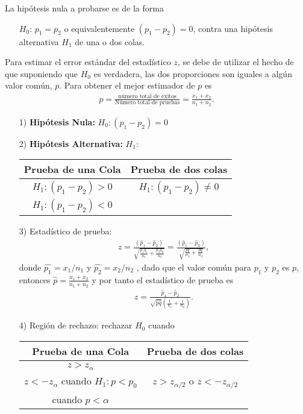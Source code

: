 \documentclass[a4paper]{report} %
\begin{document}
La hip\'otesis nula a probarse es de la forma
\begin{itemize}
\item[$H_{0}$: ] $p_{1}=p_{2}$ o equivalentemente $\left(p_{1}-p_{2}\right)=0$, contra una hip\'otesis alternativa $H_{1}$ de una o dos colas.
\end{itemize}

Para estimar el error est\'andar del estad\'istico $z$, se debe de utilizar el hecho de que suponiendo que $H_{0}$ es verdadera, las dos proporciones son iguales a alg\'un valor com\'un, $p$. Para obtener el mejor estimador de $p$ es
\begin{eqnarray}p=\frac{\textrm{n\'umero total de \'exitos}}{\textrm{N\'umero total de pruebas}}=\frac{x_{1}+x_{2}}{n_{1}+n_{2}}.\end{eqnarray}

\begin{itemize}
\item[1) ] \textbf{Hip\'otesis Nula:} $H_{0}:\left(p_{1}-p_{2}\right)=0$
\item[2) ] \textbf{Hip\'otesis Alternativa: } $H_{1}:$
\begin{center}
\begin{tabular}{cc}\hline
\textbf{Prueba de una Cola} & \textbf{Prueba de dos colas}\\\hline
$H_{1}:\left(p_{1}-p_{2}\right)>0$ & $H_{1}:\left(p_{1}-p_{2}\right)\neq 0$\\ 
$H_{1}:\left(p_{1}-p_{2}\right)<0$&\\
\end{tabular}
\end{center}
\item[3) ] Estad\'istico de prueba:
\begin{eqnarray}
z=\frac{\left(\hat{p}_{1}-\hat{p}_{2}\right)}{\sqrt{\frac{p_{1}q_{1}}{n_{1}}+\frac{p_{2}q_{2}}{n_{2}}}}=\frac{\left(\hat{p}_{1}-\hat{p}_{2}\right)}{\sqrt{\frac{pq}{n_{1}}+\frac{pq}{n_{2}}}},
\end{eqnarray}
donde $\hat{p_{1}}=x_{1}/n_{1}$ y $\hat{p_{2}}=x_{2}/n_{2}$ , dado que el valor com\'un para $p_{1}$ y $p_{2}$ es $p$, entonces $\hat{p}=\frac{x_{1}+x_{2}}{n_{1}+n_{2}}$ y por tanto el estad\'istico de prueba es
\begin{eqnarray}
z=\frac{\hat{p}_{1}-\hat{p}_{2}}{\sqrt{\hat{p}\hat{q}}\left(\frac{1}{n_{1}}+\frac{1}{n_{2}}\right)}.
\end{eqnarray}
\item[4) ] Regi\'on de rechazo: rechazar $H_{0}$ cuando
\begin{center}
\begin{tabular}{cc}\hline
\textbf{Prueba de una Cola} & \textbf{Prueba de dos colas}\\\hline
$z>z_{\alpha}$ & \\
$z<-z_{\alpha}$ cuando $H_{1}:p<p_{0}$&$z>z_{\alpha/2}$ o $z<-z_{\alpha/2}$\\
 cuando $p<\alpha$&\\
\end{tabular}
\end{center}
\end{itemize}
\end{document}
